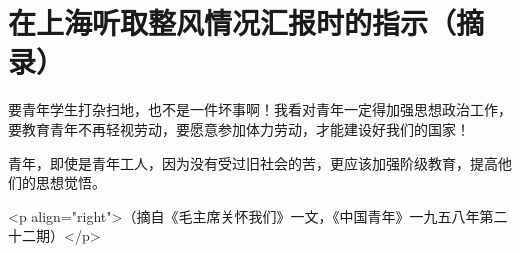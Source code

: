 \section[在上海听取整风情况汇报时的指示（摘录）（一九五七年九月十七日）]{在上海听取整风情况汇报时的指示（摘录）}


要青年学生打杂扫地，也不是一件坏事啊！我看对青年一定得加强思想政治工作，要教育青年不再轻视劳动，要愿意参加体力劳动，才能建设好我们的国家！

青年，即使是青年工人，因为没有受过旧社会的苦，更应该加强阶级教育，提高他们的思想觉悟。

<p align="right">（摘自《毛主席关怀我们》一文，《中国青年》一九五八年第二十二期）</p>


